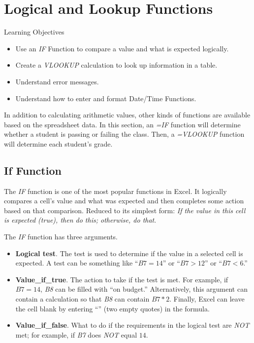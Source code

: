 \section{Logical and Lookup Functions}

\begin{center}
	\begin{objbox}{Learning Objectives}
		\begin{itemize}
			\setlength{\itemsep}{0pt}
			\setlength{\parskip}{0pt}
			\setlength{\parsep}{0pt}

			\item Use an \textit{IF} Function to compare a value and what is expected logically.
			\item Create a \textit{VLOOKUP} calculation to look up information in a table.
			\item Understand error messages.
			\item Understand how to enter and format Date/Time Functions.
			
		\end{itemize}
	\end{objbox}
\end{center}

In addition to calculating arithmetic values, other kinds of functions are available based on the spreadsheet data. In this section, an \textit{=IF} function will determine whether a student is passing or failing the class. Then, a \textit{=VLOOKUP} function will determine each student's grade.

\subsection{If Function}

The \textit{IF} function is one of the most popular functions in Excel. It logically compares a cell's value and what was expected and then completes some action based on that comparison. Reduced to its simplest form: \textit{If the value in this cell is expected (true), then do this; otherwise, do that}.

The \textit{IF} function has three arguments.

\begin{itemize}
	\item \textbf{Logical test}. The test is used to determine if the value in a selected cell is expected. A test can be something like ``$ B7=14 $'' or ``$ B7>12 $'' or ``$ B7<6 $.''
	\item \textbf{Value\_if\_true}. The action to take if the test is met. For example, if $ B7=14 $, \textit{B8} can be filled with ``on budget.'' Alternatively, this argument can contain a calculation so that \textit{B8} can contain $ B7*2 $. Finally, Excel can leave the cell blank by entering ``'' (two empty quotes) in the formula.
	\item \textbf{Value\_if\_false}. What to do if the requirements in the logical test are \textit{NOT} met; for example, if \textit{B7} does \textit{NOT} equal $ 14 $. 
\end{itemize}

